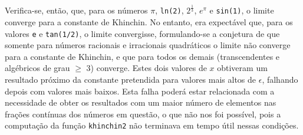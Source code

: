 \documentclass[12pt,a4paper]{article}
\begin{document}
        Verifica-se, então, que, para os números \(\pi\), \texttt{ln(2)}, \(2^{\frac{1}{3}}\), \(e^\pi\) e \texttt{sin(1)}, o limite converge para a constante de Khinchin. No entanto, era expectável que, para os valores \texttt{e} e \texttt{tan(1/2)}, o limite convergisse, formulando-se a conjetura de que somente para números racionais e irracionais quadráticos o limite não converge para a constante de Khinchin, e que para todos os demais (transcendentes e algébricos de grau \(\geq\) 3) converge. Estes dois valores de \(x\) obtiveram um resultado próximo da constante pretendida para valores mais altos de \(\epsilon\), falhando depois com valores mais baixos. Esta falha poderá estar relacionada com a necessidade de obter os resultados com um maior número de elementos nas frações contínuas dos números em questão, o que não nos foi possível, pois a computação da função \texttt{khinchin2} não terminava em tempo útil nessas condições.
\end{document}
